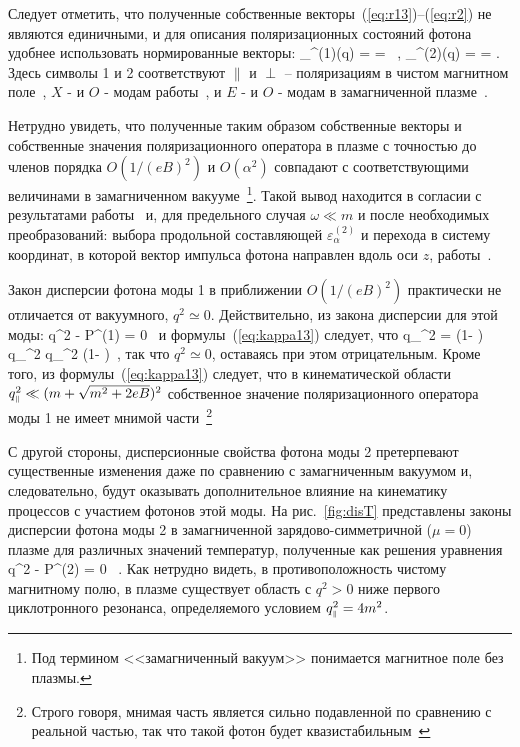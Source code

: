 Следует отметить, что полученные собственные 
векторы~(\ref{eq:r13})--(\ref{eq:r2}) не являются единичными, и для описания 
поляризационных состояний фотона удобнее использовать нормированные векторы:
%
\beq
\label{eq:epsilon}
\varepsilon_\alpha^{(1)}(q) =  = 
 \, , \quad
\varepsilon_\alpha^{(2)}(q) =  = 
.
\eeq
\noindent Здесь символы 1 и 2 соответствуют  $\|$ и $\perp$ --  поляризациям в чистом магнитном поле~\cite{Adler:1971}, $X$ - и $O$ -  модам работы~\cite{Mushtukov:2016}, и $E$ - и $O$ -  модам в замагниченной плазме~\cite{Thompson:1996}. 

Нетрудно увидеть, что полученные таким образом собственные векторы и собственные значения поляризационного 
оператора в плазме с точностью до членов порядка  $O(1/(eB)^2)$ и 
$O(\alpha^2)$ совпадают с соответствующими величинами в  замагниченном 
вакууме~\footnote{Под термином <<замагниченный вакуум>>  понимается магнитное 
поле без плазмы.}. Такой вывод находится в согласии с результатами 
работы~\cite{Shabad:1988} и, для предельного случая $\omega \ll m$ и после 
необходимых преобразований: выбора продольной составляющей 
$\varepsilon^{(2)}_\alpha$ и перехода в систему координат, в которой вектор 
импульса фотона направлен вдоль оси $z$, работы~\cite{Potekhin:2004}.

Закон дисперсии фотона моды 1 в приближении $O(1/(eB)^2)$ практически не отличается от вакуумного, $q^2 \simeq 0$. Действительно, из закона дисперсии для этой моды:
%
\beq
q^2 - {\cal P}^{(1)} = 0 \, 
\label{disper1}
\eeq
\noindent и формулы~(\ref{eq:kappa13}) следует, что
%
\beq
q_{\mprl}^2 = \left (1- \frac{\alpha}{3\pi}  \right) \, q_{\mprp}^2  
\simeq q_{\mprp}^2 \left (1- \frac{\alpha}{3\pi} \right)\, , 
\label{disper12}
\eeq
\noindent так что $q^2 \simeq 0$, оставаясь при этом отрицательным. Кроме того, 
из формулы~(\ref{eq:kappa13}) следует, что в кинематической области 
$q^2_{\mbox{\tiny $\|$}} \ll (m+\sqrt{m^2+2 eB})^2$ собственное значение поляризационного 
оператора моды 1 не имеет мнимой части~\footnote{Строго говоря, мнимая часть 
является сильно подавленной по сравнению с реальной частью, так что такой фотон 
будет квазистабильным~\cite{YarkovPhotDampPAN:2022}}


С другой стороны, дисперсионные свойства фотона моды 2  претерпевают 
существенные изменения даже по сравнению с замагниченным вакуумом и, 
следовательно, будут оказывать дополнительное влияние на кинематику процессов с 
участием фотонов этой моды. На рис.~\ref{fig:disT} представлены законы 
дисперсии фотона моды 2 в замагниченной зарядово-симметричной ($\mu=0$) плазме 
для различных значений температур, полученные как 
решения уравнения
%
\beq
q^2 - {\cal P}^{(2)} = 0 \, .
\label{disper}
\eeq
\noindent Как нетрудно видеть, в противоположность чистому 
магнитному полю, в плазме существует область с  $q^2 > 0$ ниже  первого  
циклотронного резонанса, определяемого условием $q^2_{\mbox{\tiny $\|$}} = 4 m^2$. 

